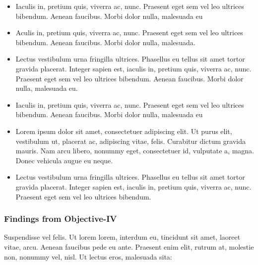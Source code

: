 \documentclass{article}
\begin{document}
\begin{itemize}
    \item Iaculis in, pretium quis, viverra ac, nunc. Praesent eget sem vel leo ultrices bibendum. Aenean faucibus. Morbi dolor nulla, malesuada eu

    \item Aculis in, pretium quis, viverra ac, nunc. Praesent eget sem vel leo ultrices bibendum. Aenean faucibus. Morbi dolor nulla, malesuada.

    \item Lectus vestibulum urna fringilla ultrices. Phasellus eu tellus sit amet tortor gravida placerat. Integer
    sapien est, iaculis in, pretium quis, viverra ac, nunc. Praesent eget sem vel leo ultrices bibendum.
    Aenean faucibus. Morbi dolor nulla, malesuada eu.

    \item Iaculis in, pretium quis, viverra ac, nunc. Praesent eget sem vel leo ultrices bibendum. Aenean faucibus. Morbi dolor nulla, malesuada eu

    \item Lorem ipsum dolor sit amet, consectetuer adipiscing elit. Ut purus elit, vestibulum ut, placerat ac,
    adipiscing vitae, felis. Curabitur dictum gravida mauris. Nam arcu libero, nonummy eget, consectetuer id, vulputate a, magna. Donec vehicula augue eu neque.

    \item Lectus vestibulum urna fringilla ultrices. Phasellus eu tellus sit amet tortor gravida placerat. Integer
    sapien est, iaculis in, pretium quis, viverra ac, nunc. Praesent eget sem vel leo ultrices bibendum.

\end{itemize}


\subsubsection{Findings from Objective-IV}
Suspendisse vel felis. Ut lorem lorem, interdum eu, tincidunt sit amet, laoreet vitae, arcu. Aenean faucibus pede eu ante. Praesent enim elit, rutrum at, molestie non, nonummy vel, nisl. Ut lectus eros, malesuada sita: 
\end{document}
